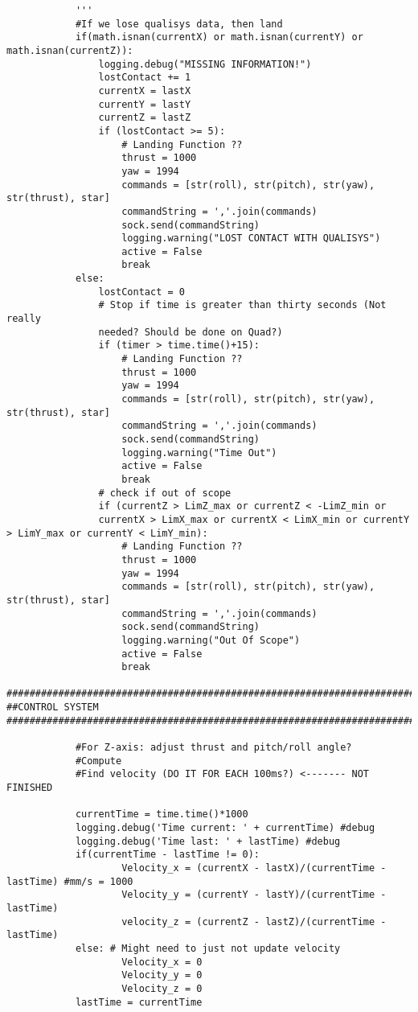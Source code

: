 \begin{lstlisting}
            '''
            #If we lose qualisys data, then land
            if(math.isnan(currentX) or math.isnan(currentY) or math.isnan(currentZ)):
                logging.debug("MISSING INFORMATION!")
                lostContact += 1
                currentX = lastX
                currentY = lastY
                currentZ = lastZ
                if (lostContact >= 5):
                    # Landing Function ??
                    thrust = 1000
                    yaw = 1994
                    commands = [str(roll), str(pitch), str(yaw), str(thrust), star]
                    commandString = ','.join(commands)
                    sock.send(commandString)
                    logging.warning("LOST CONTACT WITH QUALISYS")
                    active = False
                    break
            else:
                lostContact = 0
                # Stop if time is greater than thirty seconds (Not really 
                needed? Should be done on Quad?)
                if (timer > time.time()+15):
                    # Landing Function ??
                    thrust = 1000
                    yaw = 1994
                    commands = [str(roll), str(pitch), str(yaw), str(thrust), star]
                    commandString = ','.join(commands)
                    sock.send(commandString)
                    logging.warning("Time Out")
                    active = False
                    break
                # check if out of scope
                if (currentZ > LimZ_max or currentZ < -LimZ_min or 
                currentX > LimX_max or currentX < LimX_min or currentY > LimY_max or currentY < LimY_min): 
                    # Landing Function ??
                    thrust = 1000
                    yaw = 1994
                    commands = [str(roll), str(pitch), str(yaw), str(thrust), star]
                    commandString = ','.join(commands)
                    sock.send(commandString)
                    logging.warning("Out Of Scope")
                    active = False
                    break

##############################################################################
##CONTROL SYSTEM
##############################################################################
     
            #For Z-axis: adjust thrust and pitch/roll angle?
            #Compute
            #Find velocity (DO IT FOR EACH 100ms?) <------- NOT FINISHED
            
            currentTime = time.time()*1000
            logging.debug('Time current: ' + currentTime) #debug
            logging.debug('Time last: ' + lastTime) #debug
            if(currentTime - lastTime != 0):
                    Velocity_x = (currentX - lastX)/(currentTime - lastTime) #mm/s = 1000
                    Velocity_y = (currentY - lastY)/(currentTime - lastTime)
                    velocity_z = (currentZ - lastZ)/(currentTime - lastTime)
            else: # Might need to just not update velocity
                    Velocity_x = 0
                    Velocity_y = 0
                    Velocity_z = 0
            lastTime = currentTime 


\end{lstlisting}
